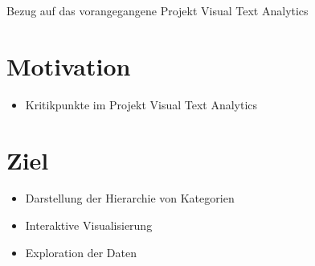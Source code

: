 
Bezug auf das vorangegangene Projekt Visual Text Analytics

\section{Motivation}
\begin{itemize}
    \item Kritikpunkte im Projekt Visual Text Analytics
    
\end{itemize}


\section{Ziel}
\begin{itemize}
    \item Darstellung der Hierarchie von Kategorien
    \item Interaktive Visualisierung
    \item Exploration der Daten
\end{itemize}













    
    


